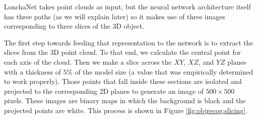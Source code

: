 LonchaNet takes point clouds as input, but the neural network architecture itself has three paths (as we will explain later) so it makes use of three images corresponding to three slices of the \ac{3D} object.

The first step towards feeding that representation to the network is to extract the slices from the \acs{3D} point cloud. To that end, we calculate the central point for each axis of the cloud. Then we make a slice across the $XY$, $XZ$, and $YZ$ planes with a thickness of $5\%$ of the model size (a value that was empirically determined to work properly). Those points that fall inside these sections are isolated and projected to the corresponding \acs{2D} planes to generate an image of $500 \times 500$ pixels. These images are binary maps in which the background is black and the projected points are white. This process is shown in Figure \ref{fig:objrecog:slicing}.


